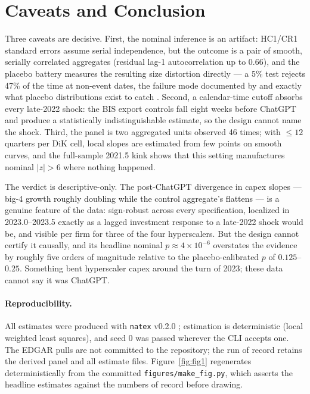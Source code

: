 \documentclass[11pt]{article}
\newcommand{\natex}{\texttt{natex}}
\begin{document}
\section{Caveats and Conclusion}\label{sec:conclusion}

Three caveats are decisive. First, the nominal inference is an artifact:
HC1/CR1 standard errors assume serial independence, but the outcome is a pair
of smooth, serially correlated aggregates (residual lag-1 autocorrelation up
to $0.66$), and the placebo battery measures the resulting size distortion
directly --- a 5\% test rejects 47\% of the time at non-event dates, the
failure mode documented by \cite{bertrand2004} and exactly what placebo
distributions exist to catch \cite{ganong2018}. Second, a calendar-time
cutoff absorbs every late-2022 shock: the BIS export controls
\cite{allen2022} fall eight weeks before ChatGPT and produce a statistically
indistinguishable estimate, so the design cannot name the shock. Third, the
panel is two aggregated units observed 46 times; with $\leq12$ quarters per
DiK cell, local slopes are estimated from few points on smooth curves, and
the full-sample 2021.5 kink shows that this setting manufactures nominal
$|z|>6$ where nothing happened.

The verdict is descriptive-only. The post-ChatGPT divergence in capex slopes
--- big-4 growth roughly doubling while the control aggregate's flattens ---
is a genuine feature of the data: sign-robust across every specification,
localized in 2023.0--2023.5 exactly as a lagged investment response to a
late-2022 shock would be, and visible per firm for three of the four
hyperscalers. But the design cannot certify it causally, and its headline
nominal $p\approx4\times10^{-6}$ overstates the evidence by roughly five
orders of magnitude relative to the placebo-calibrated $p$ of $0.125$--$0.25$.
Something bent hyperscaler capex around the turn of 2023; these data cannot
say it was ChatGPT.

\paragraph{Reproducibility.} All estimates were produced with \natex{} v0.2.0
\cite{natex}; estimation is deterministic (local weighted least squares), and
seed 0 was passed wherever the CLI accepts one. The EDGAR pulls are not
committed to the repository; the run of record retains the derived panel and
all estimate files. Figure~\ref{fig:fig1} regenerates deterministically from
the committed \texttt{figures/make\_fig.py}, which asserts the headline
estimates against the numbers of record before drawing.
\end{document}
